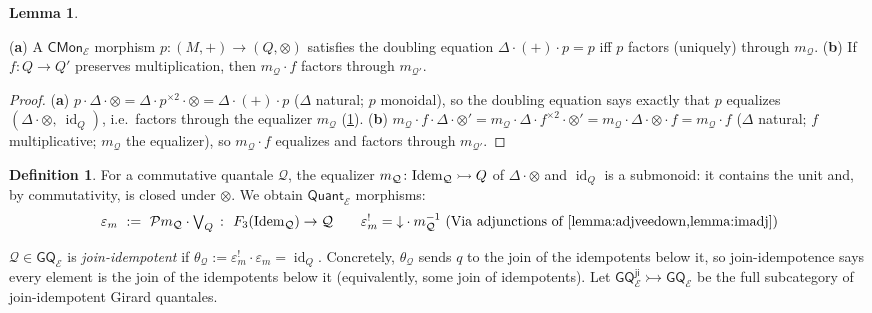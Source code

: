\documentclass{article}
\makeatletter
\newcommand{\allproofs}{} %
\newif\ifproofsinappendix
\newcommand{\lemmawithproof}[3]{%
  \begin{lemma}\label{#1}
    #2  
    \ifproofsinappendix \hyperref[xxx#1]{(Proof)} \fi
  \end{lemma}
    \ifproofsinappendix
  \g@addto@macro\allproofs{%
    \par\medskip
    \noindent
    \subsection*{\cref{#1}}\par
    #2\par
    \begin{proof}\label{xxx#1}
      #3
    \end{proof}%
  }
      \else

    \begin{proof}
      #3
    \end{proof}
    \fi 
}
\theoremstyle{definition}
\newtheorem{definition}{Definition}[section]
\newtheorem{lemma}{Lemma}[section]
\newcommand{\cE}{\mathcal{E}}
\newcommand{\cP}{\mathcal{P}}
\newcommand{\cQ}{\mathcal{Q}}
\newcommand{\cat}[1]{\mathsf{#1}}
\newcommand{\id}{\operatorname{id}}
\makeatother
\begin{document}
\lemmawithproof{lemma:idem}{
({\bf a}) A $\cat{CMon}_\cE$ morphism $p\colon(M,+)\to(Q,\otimes)$ satisfies the doubling equation $\Delta\cdot(+)\cdot p=p$ iff $p$ factors (uniquely) through $m_\cQ$. ({\bf b}) If $f\colon Q\to Q'$ preserves multiplication, then $m_\cQ\cdot f$ factors through $m_{\cQ'}$.
}{
({\bf a}) $p\cdot\Delta\cdot\otimes=\Delta\cdot p^{\times2}\cdot\otimes
=\Delta\cdot(+)\cdot p$ ($\Delta$ natural; $p$ monoidal), so the doubling equation says exactly that $p$ equalizes $(\Delta\cdot\otimes,\ \id_Q)$, i.e.\ factors through the equalizer $m_\cQ$ (\cref{def:gqji}).
({\bf b}) $m_\cQ\cdot f\cdot\Delta\cdot\otimes' =m_\cQ\cdot\Delta\cdot f^{\times2}\cdot\otimes' =m_\cQ\cdot\Delta\cdot\otimes\cdot f =m_\cQ\cdot f$ ($\Delta$ natural; $f$ multiplicative; $m_\cQ$ the equalizer), so $m_\cQ\cdot f$ equalizes and factors through $m_{\cQ'}$.
}


\begin{definition}\label{def:gqji}
For a commutative quantale $\cQ$, the equalizer $m_\cQ\colon{\rm Idem}_\cQ\rightarrowtail Q$ of $\Delta\cdot\otimes$ and $\id_Q$ is a submonoid: it contains the unit and, by commutativity, is closed under $\otimes$. We obtain $\cat{Quant}_\cE$ morphisms:
\[
\varepsilon_m\ :=\ \cP m_\cQ\cdot\textstyle\bigvee_Q\ \colon\
F_3({\rm Idem}_\cQ)\to\cQ
\qquad
\varepsilon_m^!={\downarrow}\cdot m_\cQ^{-1}
\ \text{(Via adjunctions of \cref{lemma:adjveedown,lemma:imadj})}
\]

$\cQ\in\cat{GQ}_\cE$ is \emph{join-idempotent} if
$\theta_\cQ:=\varepsilon_m^!\cdot\varepsilon_m=\id_Q$. Concretely,
$\theta_\cQ$ sends $q$ to the join of the idempotents below it, so
join-idempotence says every element is the join of the idempotents below it
(equivalently, some join of idempotents). Let
$\cat{GQ^{ji}_\cE}\rightarrowtail\cat{GQ}_\cE$ be the full subcategory of
join-idempotent Girard quantales.
\end{definition}
\end{document}
